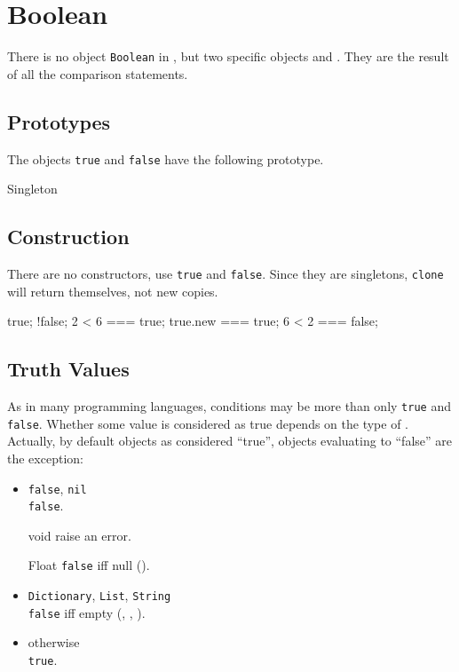 
\section{Boolean}

There is no object \lstinline|Boolean| in \us, but two specific
objects  and .  They are the result of
all the comparison statements.


\subsection{Prototypes}

The objects \lstinline|true| and \lstinline|false| have the following
prototype.

\begin{refObjects}
\item[Singleton]
\end{refObjects}

\subsection{Construction}

There are no constructors, use \lstinline|true| and \lstinline|false|.
Since they are singletons, \lstinline|clone| will return themselves,
not new copies.

\begin{urbiassert}[firstnumber=1]
true;
!false;
2 < 6 === true;
true.new === true;
6 < 2 === false;
\end{urbiassert}

\subsection{Truth Values}
\label{sec:truth}

As in many programming languages, conditions may be more than only
\lstinline|true| and \lstinline|false|.  Whether some value is
considered as true depends on the type of \this.  Actually,
by default objects as considered ``true'', objects evaluating to
``false'' are the exception:
\begin{itemize}
\item \lstinline|false|, \lstinline|nil|\\
  \lstinline|false|.
\item[void]
  raise an error.
\item[Float]
  \lstinline|false| iff null ().
\item \lstinline|Dictionary|, \lstinline|List|,  \lstinline|String|\\
  \lstinline|false| iff empty (,
  , ).
\item otherwise\\
  \lstinline|true|.
\end{itemize}

